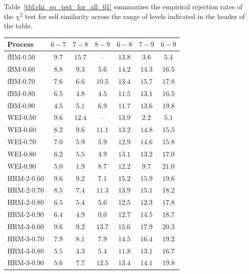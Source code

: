 \documentclass[a4paper]{article}
\begin{document}
Table~\ref{tbl:chi_sq_test_for_all_01} summarizes the empirical rejection rates of
the $\chi^2$ test for self similarity across the range of levels indicated in the
header of the table.
\begin{table}[h]\begin{center}
	\begin{tabular}{l||c|c|c|c|c|c|}
	Process 		& $6-7$ &  $7-8$ &  $8-9$ &  $6-8$ &  $7-9$ &  $6-9$ \\ \hline\hline
	  fBM-$0.50$	& $9.7$ & $15.7$ &     -- & $13.8$ &  $\mathbf{3.6}$ &  $5.4$ \\ \hline
	  fBM-$0.60$	& $8.8$ &  $9.3$ &  $\mathbf{5.6}$ & $14.2$ & $14.3$ & $16.5$ \\ \hline
	  fBM-$0.70$	& $7.6$ &  $\mathbf{6.6}$ & $10.5$ & $13.4$ & $15.7$ & $17.8$ \\ \hline
	  fBM-$0.80$	& $6.5$ &  $4.8$ &  $\mathbf{4.5}$ & $11.5$ & $13.1$ & $16.5$ \\ \hline
	  fBM-$0.90$	& $\mathbf{4.5}$ &  $5.1$ &  $6.9$ & $11.7$ & $13.6$ & $19.8$ \\ \hline\hline

	  WEI-$0.50$	& $9.6$ & $12.4$ &     -- & $13.9$ &  $\mathbf{2.2}$ &  $5.1$ \\ \hline
	  WEI-$0.60$	& $\mathbf{8.2}$ &  $9.6$ & $11.1$ & $13.2$ & $14.8$ & $15.5$ \\ \hline
	  WEI-$0.70$	& $7.0$ &  $\mathbf{5.9}$ &  $\mathbf{5.9}$ & $12.9$ & $14.6$ & $15.8$ \\ \hline
	  WEI-$0.80$	& $6.2$ &  $5.5$ &  $\mathbf{4.9}$ & $13.1$ & $13.2$ & $17.0$ \\ \hline
	  WEI-$0.90$	& $5.0$ &  $\mathbf{1.9}$ &  $8.7$ & $12.2$ &  $9.7$ & $21.0$ \\ \hline\hline

	HRM-2-$0.60$ 	& $9.6$ &  $9.2$ &  $\mathbf{7.1}$ & $15.2$ & $15.9$ & $19.6$ \\ \hline
	HRM-2-$0.70$ 	& $8.5$ &  $\mathbf{7.4}$ & $11.3$ & $13.9$ & $15.1$ & $18.2$ \\ \hline
	HRM-2-$0.80$ 	& $6.5$ &  $\mathbf{5.4}$ &  $5.6$ & $12.5$ & $12.3$ & $17.8$ \\ \hline
	HRM-2-$0.90$ 	& $6.4$ &  $\mathbf{4.9}$ &  $0.0$ & $12.7$ & $14.5$ & $18.7$ \\ \hline\hline

	HRM-3-$0.60$ 	& $9.6$ &  $\mathbf{9.2}$ & $13.7$ & $15.6$ & $17.9$ & $20.3$ \\ \hline
	HRM-3-$0.70$ 	& $\mathbf{7.9}$ &  $8.1$ &  $\mathbf{7.9}$ & $14.5$ & $16.4$ & $19.2$ \\ \hline
	HRM-3-$0.80$ 	& $5.5$ &  $\mathbf{4.3}$ &  $5.4$ & $11.8$ & $13.1$ & $16.7$ \\ \hline
	HRM-3-$0.90$ 	& $\mathbf{5.6}$ &  $7.7$ & $12.5$ & $13.4$ & $14.1$ & $19.8$ \\ \hline\hline


\end{tabular}
\end{center}
\end{table}
\end{document}
